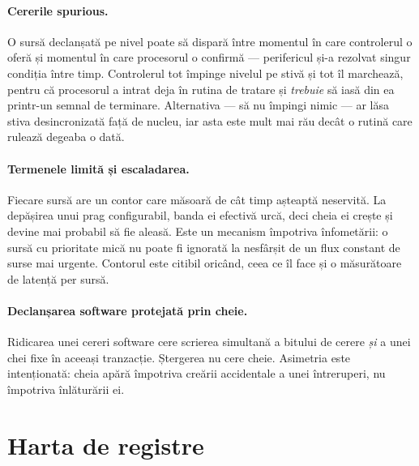 \documentclass[11pt,openany]{report}
\begin{document}
\paragraph{Cererile spurious.} O sursă declanșată pe nivel poate să dispară
între momentul în care controlerul o oferă și momentul în care procesorul o
confirmă --- perifericul și-a rezolvat singur condiția între timp. Controlerul
tot împinge nivelul pe stivă și tot îl marchează, pentru că procesorul a intrat
deja în rutina de tratare și \emph{trebuie} să iasă din ea printr-un semnal de
terminare. Alternativa --- să nu împingi nimic --- ar lăsa stiva desincronizată
față de nucleu, iar asta este mult mai rău decât o rutină care rulează degeaba
o dată.

\paragraph{Termenele limită și escaladarea.} Fiecare sursă are un contor care
măsoară de cât timp așteaptă neservită. La depășirea unui prag configurabil,
banda ei efectivă urcă, deci cheia ei crește și devine mai probabil să fie
aleasă. Este un mecanism împotriva înfometării: o sursă cu prioritate mică nu
poate fi ignorată la nesfârșit de un flux constant de surse mai urgente.
Contorul este citibil oricând, ceea ce îl face și o măsurătoare de latență per
sursă.

\paragraph{Declanșarea software protejată prin cheie.} Ridicarea unei cereri
software cere scrierea simultană a bitului de cerere \emph{și} a unei chei fixe
în aceeași tranzacție. Ștergerea nu cere cheie. Asimetria este intenționată:
cheia apără împotriva creării accidentale a unei întreruperi, nu împotriva
înlăturării ei.

\section{Harta de registre}
\end{document}
